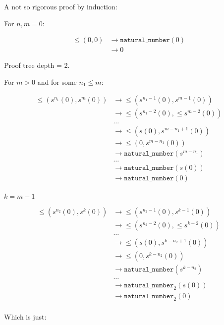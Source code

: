 \documentclass{article}
\newcommand{\n}{\texttt{natural\_number}}
\begin{document}
A not so rigorous proof by induction:

For $n, m = 0$:

\[
   \begin{aligned}
      \le(0, 0) & \longrightarrow \n(0) \\
         & \longrightarrow 0 
   \end{aligned}
\]

Proof tree depth = 2.

For $m > 0$ and for some $n_1 \le m$:

\[
   \begin{aligned}
      \le(s^{n_1}(0), s^{m}(0)) & \longrightarrow \le(s^{n_1-1}(0), s^{m-1}(0)) \\
         & \longrightarrow  \le(s^{n_1-2}(0), \le s^{m-2}(0)) \\
         & \ldots \\
         & \longrightarrow \le(s(0), s^{m-n_1+1}(0)) \\
         & \longrightarrow \le(0,  s^{m-n_1}(0)) \\
         & \longrightarrow \n(s^{m-n_1}) \\
         & \ldots \\
         & \longrightarrow \n(s(0)) \\
         & \longrightarrow \n(0) \\
   \end{aligned}
\]

$k = m - 1$

\[
   \begin{aligned}
      \le(s^{n_2}(0), s^{k}(0)) & \longrightarrow \le(s^{n_2-1}(0), s^{k-1}(0)) \\
         & \longrightarrow  \le(s^{n_2-2}(0), \le s^{k-2}(0)) \\
         & \ldots \\
         & \longrightarrow \le(s(0), s^{k-n_2+1}(0)) \\
         & \longrightarrow \le(0,  s^{k-n_2}(0)) \\
         & \longrightarrow \n(s^{k-n_2}) \\
         & \ldots \\
         & \longrightarrow \n_2(s(0)) \\
         & \longrightarrow \n_2(0) \\
   \end{aligned}
\]

Which is just:
\end{document}
